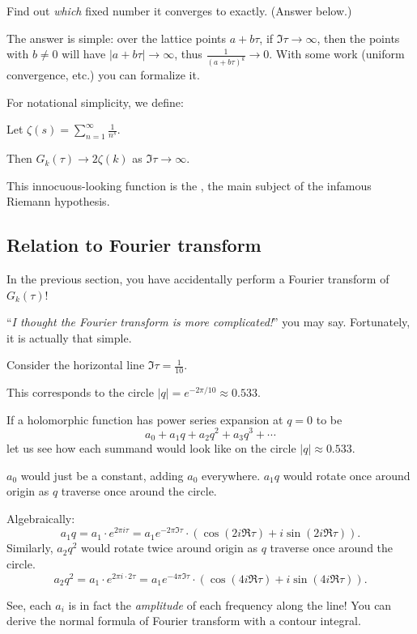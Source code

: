 \begin{exercise}
	Find out \emph{which} fixed number it converges to exactly. (Answer below.)
\end{exercise}

The answer is simple: over the lattice points $a+b \tau$, if $\Im \tau \to \infty$, then the points
with $b \neq 0$ will have $|a+b \tau| \to \infty$, thus $\frac{1}{(a+b \tau)^k}\to 0$.
With some work (uniform convergence, etc.) you can formalize it.

For notational simplicity, we define:
\begin{definition}
	Let $\zeta(s) = \sum_{n=1}^\infty \frac{1}{n^s}$.
\end{definition}
Then $G_k(\tau) \to 2 \zeta(k)$ as $\Im \tau \to \infty$.

\begin{remark}
	This innocuous-looking function is the , the main subject of the
	infamous Riemann hypothesis.
\end{remark}

\subsection{Relation to Fourier transform}

In the previous section, you have accidentally perform a Fourier transform of $G_k(\tau)$!

``\emph{I thought the Fourier transform is more complicated!}'' you may say.
Fortunately, it is actually that simple.

Consider the horizontal line $\Im \tau = \frac{1}{10}$.

This corresponds to the circle $|q| = e^{-2 \pi/10} \approx 0.533$.


If a holomorphic function has power series expansion at $q=0$ to be
\[ a_0+a_1 q+a_2 q^2+a_3 q^3+\cdots \]
let us see how each summand would look like on the circle $|q|\approx 0.533$.
\begin{itemize}
	\ii $a_0$ would just be a constant, adding $a_0$ everywhere.
	\ii $a_1 q$ would rotate once around origin as $q$ traverse once around the circle.

	Algebraically:
	\[ a_1 q = a_1 \cdot e^{2 \pi i \tau}
	= a_1 e^{-2 \pi \Im\tau} \cdot (\cos (2i \Re \tau) + i \sin (2i \Re \tau)).  \]
	\ii Similarly, $a_2 q^2$ would rotate twice around origin as $q$ traverse once around the
	circle.
	\[ a_2 q^2 = a_1 \cdot e^{2 \pi i \cdot 2 \tau}
	= a_1 e^{-4 \pi \Im\tau} \cdot (\cos (4i \Re \tau) + i \sin (4i \Re \tau)).  \]
\end{itemize}
See, each $a_i$ is in fact the \emph{amplitude} of each frequency along the line!
You can derive the normal formula of Fourier transform with a contour integral.

